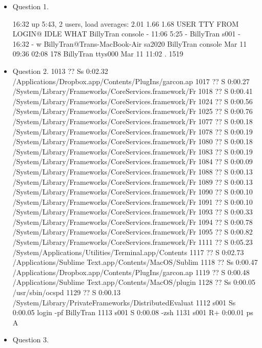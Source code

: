 \documentclass[paper=a4, fontsize=11pt]{scrartcl}
\numberwithin{equation}{section}		%
\numberwithin{figure}{section}			%
\numberwithin{table}{section}				%
\begin{document}
\begin{itemize}
	\item Question 1.
	
	16:32  up  5:43, 2 users, load averages: 2.01 1.66 1.68
	USER     TTY      FROM              LOGIN@  IDLE WHAT
	BillyTran console  -                11:06    5:25 -
	BillyTran s001     -                16:32       - w
	BillyTran@Trans-MacBook-Air sa2020 %
	BillyTran console  Mar 11 09:36 02:08 	   178
	BillyTran ttys000  Mar 11 11:02   .   	  1519
	
	\item Question 2.
	1013   ??  Ss     0:02.32 /Applications/Dropbox.app/Contents/PlugIns/garcon.ap
	 1017   ??  S      0:00.27 /System/Library/Frameworks/CoreServices.framework/Fr
	 1018   ??  S      0:00.41 /System/Library/Frameworks/CoreServices.framework/Fr
	 1024   ??  S      0:00.56 /System/Library/Frameworks/CoreServices.framework/Fr
	 1025   ??  S      0:00.76 /System/Library/Frameworks/CoreServices.framework/Fr
	 1077   ??  S      0:00.18 /System/Library/Frameworks/CoreServices.framework/Fr
	 1078   ??  S      0:00.19 /System/Library/Frameworks/CoreServices.framework/Fr
	 1080   ??  S      0:00.18 /System/Library/Frameworks/CoreServices.framework/Fr
	 1083   ??  S      0:00.19 /System/Library/Frameworks/CoreServices.framework/Fr
	 1084   ??  S      0:00.09 /System/Library/Frameworks/CoreServices.framework/Fr
	 1088   ??  S      0:00.13 /System/Library/Frameworks/CoreServices.framework/Fr
	 1089   ??  S      0:00.13 /System/Library/Frameworks/CoreServices.framework/Fr
	 1090   ??  S      0:00.10 /System/Library/Frameworks/CoreServices.framework/Fr
	 1091   ??  S      0:00.10 /System/Library/Frameworks/CoreServices.framework/Fr
	 1093   ??  S      0:00.33 /System/Library/Frameworks/CoreServices.framework/Fr
	 1094   ??  S      0:00.78 /System/Library/Frameworks/CoreServices.framework/Fr
	 1095   ??  S      0:00.82 /System/Library/Frameworks/CoreServices.framework/Fr
	 1111   ??  S      0:05.23 /System/Applications/Utilities/Terminal.app/Contents
	 1117   ??  S      0:02.73 /Applications/Sublime Text.app/Contents/MacOS/Sublim
	 1118   ??  Ss     0:00.47 /Applications/Dropbox.app/Contents/PlugIns/garcon.ap
	 1119   ??  S      0:00.48 /Applications/Sublime Text.app/Contents/MacOS/plugin
	 1128   ??  Ss     0:00.05 /usr/sbin/ocspd
	 1129   ??  S      0:00.13 /System/Library/PrivateFrameworks/DistributedEvaluat
	 1112 s001  Ss     0:00.05 login -pf BillyTran
	 1113 s001  S      0:00.08 -zsh
	 1131 s001  R+     0:00.01 ps A
	
	\item Question 3.
	

\end{itemize}
\end{document}
